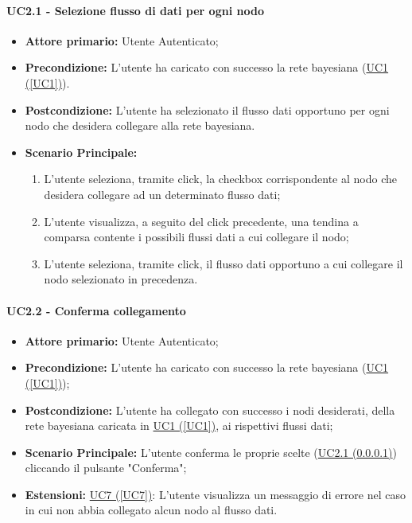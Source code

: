 \paragraph{UC2.1 - Selezione flusso di dati per ogni nodo}\label{UC2.1}
\begin{itemize}
\item \textbf{Attore primario:} Utente Autenticato;
\item \textbf{Precondizione:} L'utente ha caricato con successo la rete bayesiana (\hyperref[UC1]{UC1 (\ref*{UC1})}).
\item \textbf{Postcondizione:} L'utente ha selezionato il flusso dati opportuno per ogni nodo che desidera collegare alla rete bayesiana.
\item \textbf{Scenario Principale:}
 \begin{enumerate}
 \item L'utente seleziona, tramite click, la checkbox corrispondente al nodo che desidera collegare ad un determinato flusso dati;
 \item L'utente visualizza, a seguito del click precedente, una tendina a comparsa contente i possibili flussi dati a cui collegare il nodo;
 \item L'utente seleziona, tramite click, il flusso dati opportuno a cui collegare il nodo selezionato in precedenza.
 \end{enumerate}
\end{itemize}

\paragraph{UC2.2 - Conferma collegamento}\label{UC2.2}
\begin{itemize}
\item \textbf{Attore primario:} Utente Autenticato;
\item \textbf{Precondizione:} L'utente ha caricato con successo la rete bayesiana (\hyperref[UC1]{UC1 (\ref*{UC1})});
\item \textbf{Postcondizione:} L'utente ha collegato con successo i nodi desiderati, della rete bayesiana caricata in \hyperref[UC1]{UC1 (\ref*{UC1})}, ai rispettivi flussi dati;
\item \textbf{Scenario Principale:} L'utente conferma le proprie scelte (\hyperref[UC2.1]{UC2.1 (\ref*{UC2.1})}) cliccando il pulsante "Conferma";
\item \textbf{Estensioni:} \hyperref[UC7]{UC7 (\ref*{UC7})}: L'utente visualizza un messaggio di errore nel caso in cui non abbia collegato alcun nodo al flusso dati.
\end{itemize}

